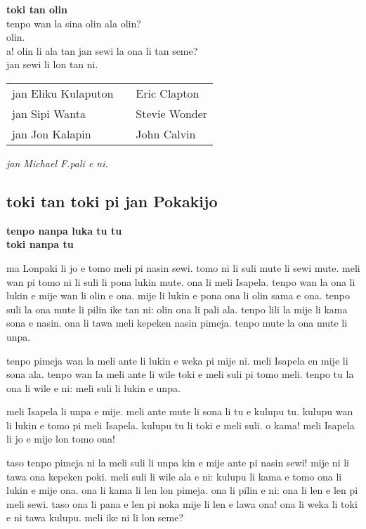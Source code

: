 \textbf{toki tan olin}   \\
tenpo wan la sina olin ala olin?   \\
olin.   \\
a! olin li ala tan jan sewi la ona li tan seme?   \\
jan sewi li lon tan ni.

\begin{supertabular}{p{5,5cm}|ll}
jan Eliku Kulaputon && Eric Clapton \\
jan Sipi Wanta  && Stevie Wonder \\ 
jan Jon Kalapin && John Calvin \\
\end{supertabular}

\textit{jan \glqq Michael F.\grqq   pali e ni. \cite{www:failbluedot:01}}
%
\newpage
\subsection{toki tan toki pi jan Pokakijo}

\textbf{tenpo nanpa luka tu tu \\
toki nanpa tu}

ma Lonpaki li jo e tomo meli pi nasin sewi.
tomo ni li suli mute li sewi mute.
meli wan pi tomo ni li suli li pona lukin mute.
ona li meli Isapela.
tenpo wan la ona li lukin e mije wan li olin e ona.
mije li lukin e pona ona li olin sama e ona.
tenpo suli la ona mute li pilin ike tan ni: olin ona li pali ala.
tenpo lili la mije li kama sona e nasin.
ona li tawa meli kepeken nasin pimeja.
tenpo mute la ona mute li unpa.

tenpo pimeja wan la meli ante li lukin e weka pi mije ni.
meli Isapela en mije li sona ala.
tenpo wan la meli ante li wile toki e meli suli pi tomo meli.
tenpo tu la ona li wile e ni: meli suli li lukin e unpa.

meli Isapela li unpa e mije.
meli ante mute li sona li tu e kulupu tu.
kulupu wan li lukin e tomo pi meli Isapela.
kulupu tu li toki e meli suli.
\glqq o kama!
meli Isapela li jo e mije lon tomo ona!\grqq

taso tenpo pimeja ni la meli suli li unpa kin e mije ante pi nasin sewi!
mije ni li tawa ona kepeken poki.
meli suli li wile ala e ni: kulupu li kama e tomo ona li lukin e mije ona.
ona li kama li len lon pimeja.
ona li pilin e ni: ona li len e len pi meli sewi.
taso ona li pana e len pi noka mije li len e lawa ona!
ona li weka li toki e ni tawa kulupu.
\glqq meli ike ni li lon seme?\grqq

